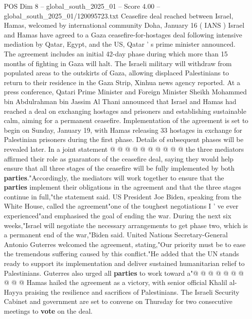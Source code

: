 \begin{textsample}{POS Dim 8 – global\_south\_2025\_01 – Score 4.00 – global\_south\_2025\_01/120095723.txt}  \label{ex:f8_pos_326}
Ceasefire deal reached between Israel, Hamas, welcomed by international community Doha, January 16 ( IANS ) Israel and Hamas have agreed to a Gaza ceasefire-for-hostages deal following intensive mediation by Qatar, Egypt, and the US, Qatar ' s prime minister announced.
The agreement includes an initial 42-day phase during which more than 15 months of fighting in Gaza will halt.
The Israeli military will withdraw from populated areas to the outskirts of Gaza, allowing displaced Palestinians to return to their residence in the Gaza Strip, Xinhua news agency reported.
At a press conference, Qatari Prime Minister and Foreign Minister Sheikh Mohammed bin Abdulrahman bin Jassim Al Thani announced that Israel and Hamas had reached a deal on exchanging hostages and prisoners and establishing sustainable calm, aiming for a permanent ceasefire.
Implementation of the agreement is set to begin on Sunday, January 19, with Hamas releasing 33 hostages in exchange for Palestinian prisoners during the first phase.
Details of subsequent phases will be revealed later.
In a joint statement @ @ @ @ @ @ @ @ @ @ the three mediators affirmed their role as guarantors of the ceasefire deal, saying they would help ensure that all three stages of the ceasefire will be fully implemented by both \textbf{parties}."Accordingly, the mediators will work together to ensure that the \textbf{parties} implement their obligations in the agreement and that the three stages continue in full,"the statement said.
US President Joe Biden, speaking from the White House, called the agreement"one of the toughest negotiations I ' ve ever experienced"and emphasised the goal of ending the war.
During the next six weeks,"Israel will negotiate the necessary arrangements to get phase two, which is a permanent end of the war,"Biden said.
United Nations Secretary-General Antonio Guterres welcomed the agreement, stating,"Our priority must be to ease the tremendous suffering caused by this conflict."He added that the UN stands ready to support its implementation and deliver sustained humanitarian relief to Palestinians.
Guterres also urged all \textbf{parties} to work toward a"@ @ @ @ @ @ @ @ @ @ Hamas hailed the agreement as a victory, with senior official Khalil al-Hayya praising the resilience and sacrifices of Palestinians.
The Israeli Security Cabinet and government are set to convene on Thursday for two consecutive meetings to \textbf{vote} on the deal.

\end{textsample}

